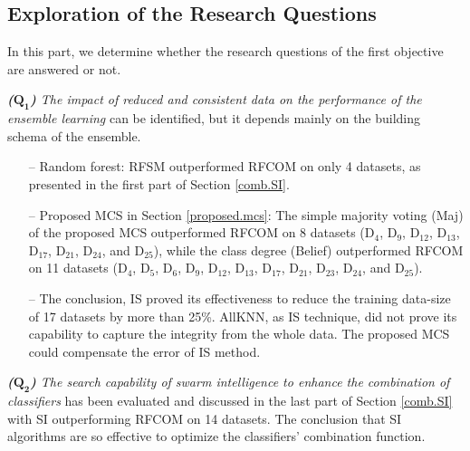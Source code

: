 \subsection{Exploration of the Research Questions} \label{ch4:explorationofres}

In this part, we determine whether the research questions of the first objective are answered or not. 

\textit{\textbf{($\pmb{Q_1}$)}  The impact of reduced and consistent data on the performance of the ensemble learning} can be identified, but it depends mainly on the building schema of the ensemble.

\begin{enumerate}[nosep]

    \item [--] Random forest: RFSM outperformed RFCOM on only 4 datasets, as presented in the first part of Section \ref{comb.SI}.
    \item[--] Proposed MCS in Section \ref{proposed.mcs}: The simple majority voting (Maj) of the proposed MCS outperformed RFCOM on 8 datasets (D$_4$, D$_9$, D$_{12}$, D$_{13}$, D$_{17}$, D$_{21}$, D$_{24}$, and D$_{25}$), while the class degree (Belief) outperformed RFCOM on 11 datasets (D$_4$, D$_5$, D$_6$, D$_9$, D$_{12}$, D$_{13}$, D$_{17}$, D$_{21}$, D$_{23}$, D$_{24}$, and D$_{25}$).
    \item[--] The conclusion, IS proved its effectiveness to reduce the training data-size of 17 datasets by more than 25\%. AllKNN, as IS technique, did not prove its capability to capture the integrity from the whole data. The proposed MCS could compensate the error of IS method. 
\end{enumerate} 

\textit{\textbf{($\pmb{Q_2}$)}  The search capability of swarm intelligence to enhance the combination of classifiers} has been evaluated and discussed in the last part of Section \ref{comb.SI} with SI outperforming RFCOM on 14 datasets. The conclusion that SI algorithms are so effective to optimize the classifiers' combination function.  


